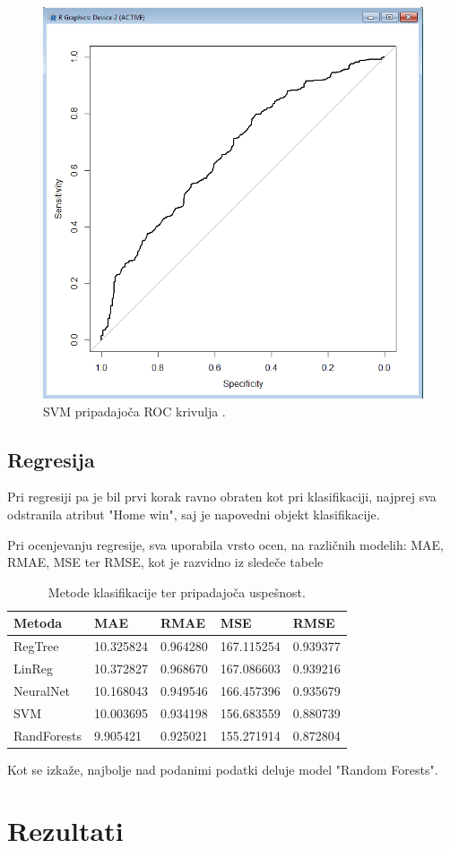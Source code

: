 \documentclass[a4paper,11pt]{article}
\begin{document}
\begin{figure}[H]
\begin{center}
\includegraphics[scale=0.5]{9_SVM_roc.png}
\caption{SVM pripadajoča ROC krivulja .}
\label{slika4}
\end{center}
\end{figure} 


\subsection{Regresija}

Pri regresiji pa je bil prvi korak ravno obraten kot pri klasifikaciji, najprej
sva odstranila atribut "Home win", saj je napovedni objekt klasifikacije.

Pri ocenjevanju regresije, sva uporabila vrsto ocen, na različnih modelih: 
MAE, RMAE, MSE ter RMSE, kot je razvidno iz sledeče tabele


\begin{table}[H]
\caption{Metode klasifikacije ter pripadajoča uspešnost.}
\label{tab1}
\begin{center}
\begin{tabular}{llllp{3cm}}
\hline
Metoda & MAE & RMAE & MSE & RMSE\\
\hline
RegTree & 10.325824 & 0.964280 & 167.115254 & 0.939377 \\
LinReg & 10.372827 & 0.968670 & 167.086603 & 0.939216 \\
NeuralNet & 10.168043 & 0.949546 & 166.457396 & 0.935679 \\
SVM & 10.003695 & 0.934198 & 156.683559 & 0.880739 \\
RandForests & 9.905421 & 0.925021 & 155.271914 & 0.872804 \\
\hline
\end{tabular}
\end{center}
\end{table}

Kot se izkaže, najbolje nad podanimi podatki deluje model "Random 
Forests". 


\section{Rezultati}
\end{document}
